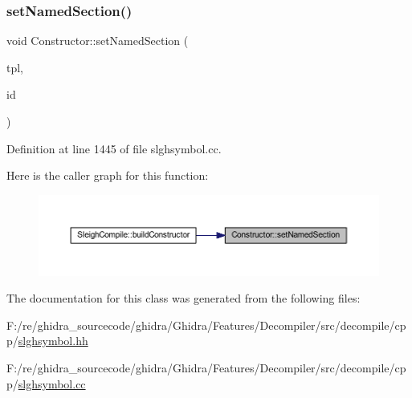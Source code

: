 \subsubsection{\texorpdfstring{setNamedSection()}{setNamedSection()}}
{\footnotesize\ttfamily void Constructor\+::set\+Named\+Section (\begin{DoxyParamCaption}\item[{\mbox{\hyperlink{class_construct_tpl}{Construct\+Tpl}} $\ast$}]{tpl,  }\item[{int4}]{id }\end{DoxyParamCaption})}



Definition at line 1445 of file slghsymbol.\+cc.

Here is the caller graph for this function\+:
\nopagebreak
\begin{figure}[H]
\begin{center}
\leavevmode
\includegraphics[width=350pt]{class_constructor_a138cd50d73a4b5475b0ca28ed682f381_icgraph}
\end{center}
\end{figure}


The documentation for this class was generated from the following files\+:\begin{DoxyCompactItemize}
\item 
F\+:/re/ghidra\+\_\+sourcecode/ghidra/\+Ghidra/\+Features/\+Decompiler/src/decompile/cpp/\mbox{\hyperlink{slghsymbol_8hh}{slghsymbol.\+hh}}\item 
F\+:/re/ghidra\+\_\+sourcecode/ghidra/\+Ghidra/\+Features/\+Decompiler/src/decompile/cpp/\mbox{\hyperlink{slghsymbol_8cc}{slghsymbol.\+cc}}\end{DoxyCompactItemize}

